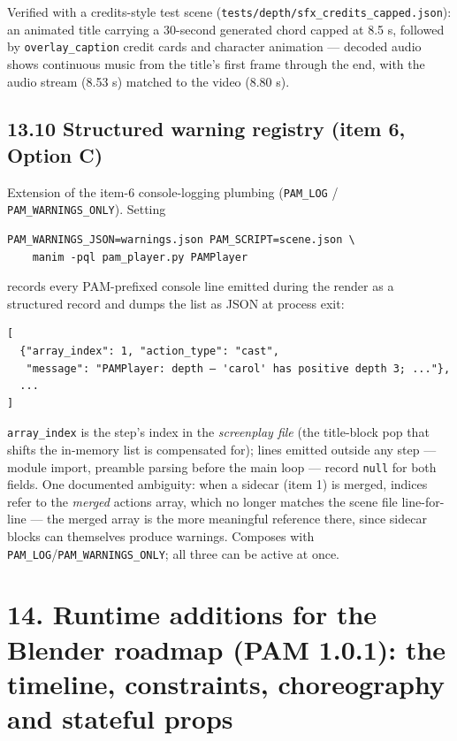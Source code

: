 \documentclass[
  12pt,
  letterpaper,
]{book}
\begin{document}
Verified with a credits-style test scene
(\texttt{tests/depth/sfx\_credits\_capped.json}): an animated title
carrying a 30-second generated chord capped at 8.5 s, followed by
\texttt{overlay\_caption} credit cards and character animation ---
decoded audio shows continuous music from the title's first frame
through the end, with the audio stream (8.53 s) matched to the video
(8.80 s).

\subsection{\texorpdfstring{13.10 Structured warning registry (item 6, Option C)}{13.10 Structured warning registry}}\label{structured-warning-registry}

Extension of the item-6 console-logging plumbing
(\texttt{PAM\_LOG} / \texttt{PAM\_WARNINGS\_ONLY}). Setting

\begin{verbatim}
PAM_WARNINGS_JSON=warnings.json PAM_SCRIPT=scene.json \
    manim -pql pam_player.py PAMPlayer
\end{verbatim}

records every PAM-prefixed console line emitted during the render as
a structured record and dumps the list as JSON at process exit:

\begin{verbatim}
[
  {"array_index": 1, "action_type": "cast",
   "message": "PAMPlayer: depth — 'carol' has positive depth 3; ..."},
  ...
]
\end{verbatim}

\texttt{array\_index} is the step's index in the \emph{screenplay
file} (the title-block pop that shifts the in-memory list is
compensated for); lines emitted outside any step --- module import,
preamble parsing before the main loop --- record \texttt{null} for
both fields. One documented ambiguity: when a sidecar
(item 1) is merged, indices refer to the \emph{merged} actions array,
which no longer matches the scene file line-for-line --- the merged
array is the more meaningful reference there, since sidecar blocks
can themselves produce warnings. Composes with
\texttt{PAM\_LOG}/\texttt{PAM\_WARNINGS\_ONLY}; all three can be
active at once.

\section{14. Runtime additions for the Blender roadmap (PAM 1.0.1): the
timeline, constraints, choreography and stateful props}\label{runtime-additions-timeline}
\end{document}
